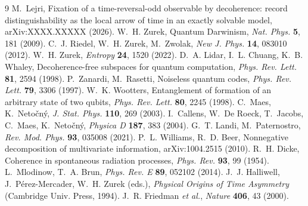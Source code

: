 \documentclass[11pt]{article}
\begin{document}
\clearpage
\begin{thebibliography}{9}\small
{} M.~Lejri, Fixation of a time-reversal-odd observable by decoherence: record distinguishability as the local arrow of time in an exactly solvable model, arXiv:XXXX.XXXXX (2026).
 W.~H. Zurek, Quantum Darwinism, \emph{Nat. Phys.} \textbf{5}, 181 (2009).
 C.~J. Riedel, W.~H. Zurek, M.~Zwolak, \emph{New J. Phys.} \textbf{14}, 083010 (2012).
 W.~H. Zurek, \emph{Entropy} \textbf{24}, 1520 (2022).
 D.~A. Lidar, I.~L. Chuang, K.~B. Whaley, Decoherence-free subspaces for quantum computation, \emph{Phys. Rev. Lett.} \textbf{81}, 2594 (1998).
 P.~Zanardi, M.~Rasetti, Noiseless quantum codes, \emph{Phys. Rev. Lett.} \textbf{79}, 3306 (1997).
 W.~K. Wootters, Entanglement of formation of an arbitrary state of two qubits, \emph{Phys. Rev. Lett.} \textbf{80}, 2245 (1998).
 C.~Maes, K.~Neto\v{c}n\'y, \emph{J. Stat. Phys.} \textbf{110}, 269 (2003).
 I.~Callens, W.~De Roeck, T.~Jacobs, C.~Maes, K.~Neto\v{c}n\'y, \emph{Physica D} \textbf{187}, 383 (2004).
 G.~T. Landi, M.~Paternostro, \emph{Rev. Mod. Phys.} \textbf{93}, 035008 (2021).
 P.~L. Williams, R.~D. Beer, Nonnegative decomposition of multivariate information, arXiv:1004.2515 (2010).
 R.~H. Dicke, Coherence in spontaneous radiation processes, \emph{Phys. Rev.} \textbf{93}, 99 (1954).
 L.~Mlodinow, T.~A. Brun, \emph{Phys. Rev. E} \textbf{89}, 052102 (2014).
 J.~J. Halliwell, J.~P\'erez-Mercader, W.~H. Zurek (eds.), \emph{Physical Origins of Time Asymmetry} (Cambridge Univ. Press, 1994).
 J.~R. Friedman \emph{et al.}, \emph{Nature} \textbf{406}, 43 (2000).
\end{thebibliography}
\end{document}
